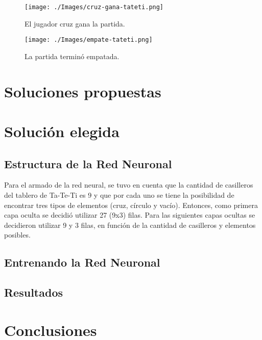 \documentclass[12pt,titlepage]{article}
\begin{document}
\begin{figure}[h!]
 \centering
 \texttt{[image: ./Images/cruz-gana-tateti.png]}
 \caption{El jugador cruz gana la partida.}
 \label{cruz-gana}
\end{figure}

\begin{figure}[h!]
 \centering
 \texttt{[image: ./Images/empate-tateti.png]}
 \caption{La partida termin\'o empatada.}
 \label{empate-tateti}
\end{figure}


\section{Soluciones propuestas}


\section{Soluci\'on elegida}

\subsection{Estructura de la Red Neuronal}
Para el armado de la red neural, se tuvo en cuenta que la cantidad de casilleros del tablero de Ta-Te-Ti es 9 y que por cada uno se tiene la posibilidad de encontrar tres tipos de elementos (cruz, c\'irculo y vac\'io). Entonces, como primera capa oculta se decidi\'o utilizar 27 (9x3) filas. Para las siguientes capas ocultas se decidieron utilizar 9 y 3 filas, en funci\'on de la cantidad de casilleros y elementos posibles.

\subsection{Entrenando la Red Neuronal}

\subsection{Resultados}

\section{Conclusiones}


\appendix
\end{document}
